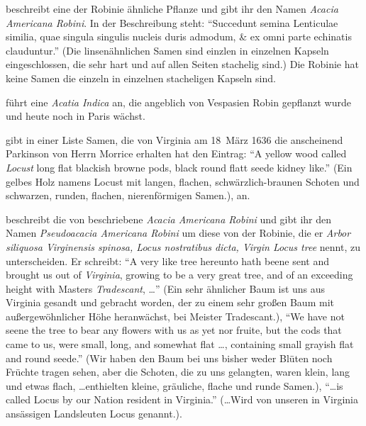 \documentclass[twocolumn]{scrartcl}
\begin{document}
\citet[S.~171--173]{cornuti1635robinie} beschreibt eine der Robinie
ähnliche Pflanze und gibt ihr den Namen \emph{Acacia Americana
Robini}. In der Beschreibung steht: \enquote{Succedunt semina Lenticulae
similia, quae singula singulis nucleis duris admodum, \& ex omni parte
echinatis clauduntur.} (Die linsenähnlichen Samen sind einzlen in
einzelnen Kapseln eingeschlossen, die sehr hart und auf allen Seiten
stachelig sind.) Die Robinie hat keine Samen die einzeln in einzelnen
stacheligen Kapseln sind.

\citet[S.~28]{deLaBrosse1636robinie} führt eine \emph{Acatia Indica}
an, die angeblich von Vespasien Robin gepflanzt wurde und heute noch
in Paris wächst.

\citet[S.~370]{gunther1922botanists} gibt in einer Liste Samen, die
von Virginia am 18~März 1636 die anscheinend Parkinson von Herrn
Morrice erhalten hat den Eintrag: \enquote{A yellow wood called
\emph{Locust} long flat blackish browne pods, black round flatt seede
kidney like.} (Ein gelbes Holz namens Locust mit langen, flachen,
schwärzlich-braunen Schoten und schwarzen, runden, flachen,
nierenförmigen Samen.), an.

\citet[S.~1550]{parkinson1640theatrumBotanicum} beschreibt die von
\citet{cornuti1635robinie} beschriebene \emph{Acacia Americana Robini}
und gibt ihr den Namen \emph{Pseudoacacia Americana Robini} um diese
von der Robinie, die er \emph{Arbor siliquosa Virginensis spinosa,
Locus nostratibus dicta, Virgin Locus tree} nennt, zu
unterscheiden. Er schreibt: \enquote{A very like tree hereunto hath beene sent and brought us out of \emph{Virginia}, growing to be a very great tree, and of an exceeding height with Masters \emph{Tradescant}, \dots}
(Ein sehr ähnlicher Baum ist uns aus Virginia gesandt und gebracht worden, der zu einem sehr großen Baum mit außergewöhnlicher Höhe heranwächst, bei Meister Tradescant.),
\enquote{We have not seene the tree to bear any flowers with us as yet nor fruite, but the cods that came to us, were small, long, and somewhat flat \dots, containing small grayish flat and round seede.}
(Wir haben den Baum bei uns bisher weder Blüten noch Früchte tragen sehen, aber die Schoten, die zu uns gelangten, waren klein, lang und etwas flach, \dots enthielten kleine, gräuliche, flache und runde Samen.),
\enquote{\dots is called Locus by our Nation resident in Virginia.}
(\dots Wird von unseren in Virginia ansässigen Landsleuten Locus genannt.).
\end{document}
